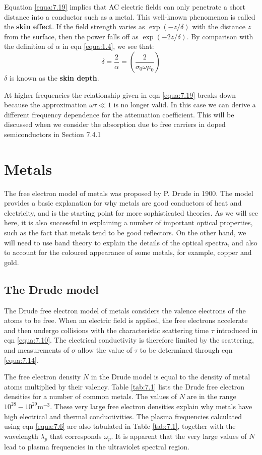 \documentclass[12pt]{book}
\begin{document}
{Equation \ref{equa:7.19} implies that AC electric fields can only penetrate a short distance into a conductor such as a metal. This well-known phenomenon is called the \textbf{skin effect}. If the field strength varies as $\exp(-z/\delta)$ with the distance $z$ from the surface, then the power falls off as $\exp(-2z/\delta)$. By comparison with the definition of $\alpha$ in eqn \ref{equa:1.4}, we see that:
\begin{equation}\label{equa:7.20}
  \delta=\frac{2}{\alpha}=(\frac{2}{\sigma_0\omega\mu_0})
\end{equation}
$\delta$ is known as the \textbf{skin depth}.

At higher frequencies the relationship given in eqn \ref{equa:7.19} breaks down because the approximation $\omega\tau\ll 1$ is no longer valid. In this case we can derive a different frequency dependence for the attenuation coefficient. This will be discussed when we consider the absorption due to free carriers in doped semiconductors in Section 7.4.1

\section{Metals}
The free electron model of metals was proposed by P. Drude in 1900. The model provides a basic explanation for why metals are good conductors of heat and electricity, and is the starting point for more sophisticated theories. As we will see here, it is also successful in explaining a number of important optical properties, such as the fact that metals tend to be good reflectors. On the other hand, we will need to use band theory to explain the details of the optical spectra, and also to account for the coloured appearance of some metals, for example, copper and gold.

\subsection{The Drude model}
The Drude free electron model of metals considers the valence electrons of the atoms to be free. When an electric field is applied, the free electrons accelerate and then undergo collisions with the characteristic scattering time $\tau$ introduced in eqn \ref{equa:7.10}. The electrical conductivity is therefore limited by the scattering, and measurements of $\sigma$ allow the value of $\tau$ to be determined through eqn \ref{equa:7.14}.

The free electron density $N$ in the Drude model is equal to the density of metal atoms multiplied by their valency. Table \ref{tab:7.1} lists the Drude free electron densities for a number of common metals. The values of $N$ are in the range $10^{28}-10^{29} \mathrm{m}^{-3}$. These very large free electron densities explain why metals have high electrical and thermal conductivities. The plasma frequencies calculated using eqn \ref{equa:7.6} are also tabulated in Table \ref{tab:7.1}, together with the wavelength $\lambda_p$ that corresponds $\omega_p$. It is apparent that the very large values of $N$ lead to plasma frequencies in the ultraviolet spectral region.

}
\end{document}
